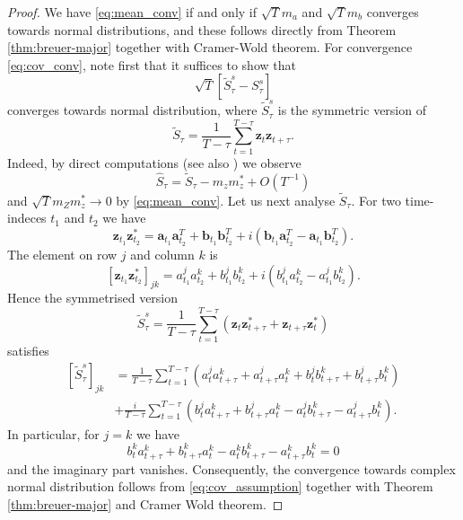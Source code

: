 \documentclass[11pt,a4paper,leqno]{amsart}
\newcommand{\1}{\mathbbm{1}}
\newcommand{\0}{\mathbf{0}}
\newcommand{\vz}{\mathbf{z}}
\newcommand{\va}{\mathbf{a}}
\newcommand{\vb}{\mathbf{b}}
\begin{document}
\begin{proof}
We have \eqref{eq:mean_conv} if and only if 
$
\sqrt{T}m_a
$
and 
$
\sqrt{T}m_b
$
converges towards normal distributions, 
and these follows directly from Theorem \ref{thm:breuer-major} together with Cramer-Wold theorem. 
For convergence \eqref{eq:cov_conv}, note first that it suffices to show that
$$
\sqrt{T}\left[\tilde{S}^s_\tau - S^s_\tau\right]
$$
converges towards normal distribution,
where $\tilde{S}^s_\tau$ is the symmetric version of 
$$
\tilde{S}_\tau = \frac{1}{T-\tau}\sum_{t=1}^{T-\tau} \vz_t \vz_{t+\tau}.
$$
Indeed, by direct computations (see also \cite[Lemma (REF)]{ilm-vii}) we observe
$$
\hat{S}_\tau = \tilde{S}_\tau  - m_zm_z^* + O(T^{-1})
$$
and $\sqrt{T}m_Zm_z^* \rightarrow 0$ by \eqref{eq:mean_conv}. Let us next analyse $\tilde{S}_\tau$. 
For two time-indeces $t_1$ and $t_2$ we have
$$
\vz_{t_1} \vz_{t_2}^* = \va_{t_1}\va_{t_2}^T + \vb_{t_1}\vb_{t_2}^T + i\left(\vb_{t_1}\va_{t_2}^T-\va_{t_1}\vb_{t_2}^T\right).
$$
The element on row $j$ and column $k$ is 
$$
\left[\vz_{t_1}\vz_{t_2}^*\right]_{jk} = a^j_{t_1}a^k_{t_2}+b^j_{t_1}b^k_{t_2} + i\left(b_{t_1}^ja_{t_2}^k-a_{t_1}^jb_{t_2}^k\right).
$$
Hence the symmetrised version  
$$
\tilde{S}_\tau^s = \frac{1}{T-\tau}\sum_{t=1}^{T-\tau}\left(\vz_t \vz_{t+\tau}^* + \vz_{t+\tau} \vz_{t}^*\right) 
$$
satisfies
\begin{equation*}
\begin{split}
\left[\tilde{S}_\tau^s\right]_{jk} &= \frac{1}{T-\tau}\sum_{t=1}^{T-\tau}\left(a^j_{t}a^k_{t+\tau}+a^j_{t+\tau}a^k_{t}+
b^j_{t}b^k_{t+\tau}+b^j_{t+\tau}b^k_{t}\right) \\
&+ 
\frac{i}{T-\tau}\sum_{t=1}^{T-\tau}\left(b_t^ja^k_{t+\tau} +b_{t+\tau}^ja^k_{t}-a_{t}^jb_{t+\tau}^k-a_{t+\tau}^jb^k_t\right).
\end{split}
\end{equation*}
In particular, for $j=k$ we have 
$$
b_t^ka^k_{t+\tau} +b_{t+\tau}^ka^k_{t}-a_{t}^kb_{t+\tau}^k-a_{t+\tau}^kb^k_t = 0
$$
and the imaginary part vanishes. Consequently, the convergence towards complex normal distribution follows from \eqref{eq:cov_assumption} together with Theorem \ref{thm:breuer-major} and Cramer Wold theorem.
\end{proof}
\end{document}
